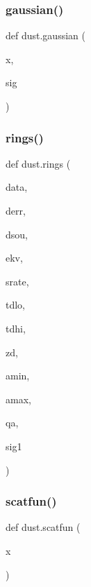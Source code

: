\mbox{\label{namespacedust_a6dd89c33055349ee910884ef05992286}} 
\subsubsection{\texorpdfstring{gaussian()}{gaussian()}}
{\footnotesize\ttfamily def dust.\+gaussian (\begin{DoxyParamCaption}\item[{}]{x,  }\item[{}]{sig }\end{DoxyParamCaption})}

\mbox{\label{namespacedust_a0147cc7beef4e9d9174a2ca9820361c7}} 
\subsubsection{\texorpdfstring{rings()}{rings()}}
{\footnotesize\ttfamily def dust.\+rings (\begin{DoxyParamCaption}\item[{}]{data,  }\item[{}]{derr,  }\item[{}]{dsou,  }\item[{}]{ekv,  }\item[{}]{srate,  }\item[{}]{tdlo,  }\item[{}]{tdhi,  }\item[{}]{zd,  }\item[{}]{amin,  }\item[{}]{amax,  }\item[{}]{qa,  }\item[{}]{sig1 }\end{DoxyParamCaption})}

\mbox{\label{namespacedust_a5a6e0ad2f8852fc242c19d92a74c62c1}} 
\subsubsection{\texorpdfstring{scatfun()}{scatfun()}}
{\footnotesize\ttfamily def dust.\+scatfun (\begin{DoxyParamCaption}\item[{}]{x }\end{DoxyParamCaption})}

